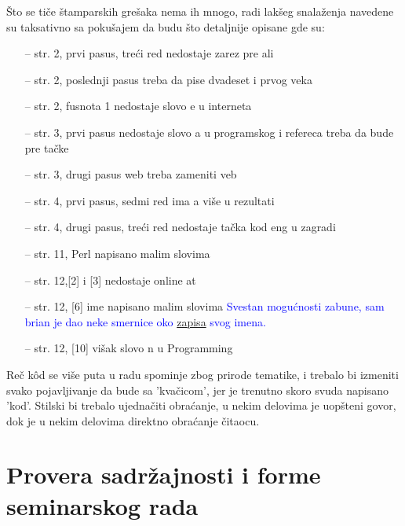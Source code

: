 \documentclass[a4paper]{report}
\newcommand{\odgovor}[1]{\textcolor{blue}{#1}}
\begin{document}
Što se tiče štamparskih grešaka nema ih mnogo, radi lakšeg snalaženja navedene su taksativno sa pokušajem da budu što detaljnije opisane gde su: 
\begin{itemize}
	\item[--] str. 2, prvi pasus, treći red nedostaje zarez pre ali
    \item[--] str. 2, poslednji pasus treba da pise dvadeset i prvog veka
    \item[--] str. 2, fusnota 1 nedostaje slovo e u interneta
    \item[--] str. 3, prvi pasus nedostaje slovo a u programskog i refereca treba da bude pre tačke
    \item[--] str. 3, drugi pasus web treba zameniti veb
    \item[--] str. 4, prvi pasus, sedmi red ima a više u rezultati 
    \item[--] str. 4, drugi pasus, treći red nedostaje tačka kod eng u zagradi
    \item[--] str. 11, Perl napisano malim slovima
    \item[--] str. 12,[2] i [3] nedostaje online at
    \item[--] str. 12, [6] ime napisano malim slovima
    \odgovor{Svestan mogućnosti zabune, sam brian je dao neke smernice oko \href{http://www252.pair.com/comdog/style.html}{zapisa} svog imena. }
    \item[--] str. 12, [10] višak slovo n u Programming     
\end{itemize}

Reč k\^{o}d se više puta u radu spominje zbog prirode tematike, i trebalo bi izmeniti svako pojavljivanje da bude sa 'kvačicom', jer je trenutno skoro svuda napisano 'kod'.
Stilski bi trebalo ujednačiti obraćanje, u nekim delovima je uopšteni govor, dok je u nekim delovima direktno obraćanje čitaocu.

\section{Provera sadržajnosti i forme seminarskog rada}
\end{document}

